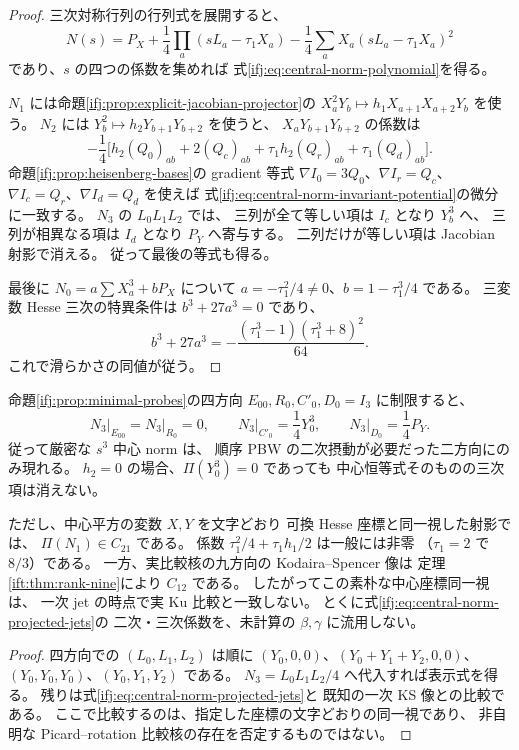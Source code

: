 \begin{proof}
三次対称行列の行列式を展開すると、
\[
 N(s)=P_X+\frac14\prod_a(sL_a-\tau_1X_a)
                  -\frac14\sum_aX_a(sL_a-\tau_1X_a)^2
\]
であり、$s$ の四つの係数を集めれば
式\eqref{ifj:eq:central-norm-polynomial}を得る。

$N_1$ には命題\ref{ifj:prop:explicit-jacobian-projector}の
$X_a^2Y_b\mapsto h_1X_{a+1}X_{a+2}Y_b$ を使う。
$N_2$ には
$Y_b^2\mapsto h_2Y_{b+1}Y_{b+2}$ を使うと、
$X_aY_{b+1}Y_{b+2}$ の係数は
\[
 -\frac14\bigl[
 h_2(Q_0)_{ab}+2(Q_c)_{ab}
  +\tau_1h_2(Q_r)_{ab}+\tau_1(Q_d)_{ab}\bigr].
\]
命題\ref{ifj:prop:heisenberg-bases}の gradient 等式
$\nabla I_0=3Q_0$、$\nabla I_r=Q_c$、
$\nabla I_c=Q_r$、$\nabla I_d=Q_d$ を使えば
式\eqref{ifj:eq:central-norm-invariant-potential}の微分に一致する。
$N_3$ の $L_0L_1L_2$ では、
三列が全て等しい項は $I_c$ となり $Y_b^3$ へ、
三列が相異なる項は $I_d$ となり $P_Y$ へ寄与する。
二列だけが等しい項は Jacobian 射影で消える。
従って最後の等式も得る。

最後に $N_0=a\sum X_a^3+bP_X$ について
$a=-\tau_1^2/4\ne0$、$b=1-\tau_1^3/4$ である。
三変数 Hesse 三次の特異条件は $b^3+27a^3=0$ であり、
\[
 b^3+27a^3
  =-\frac{(\tau_1^3-1)(\tau_1^3+8)^2}{64}.
\]
これで滑らかさの同値が従う。
\end{proof}

\begin{corollary}
\label{ifj:cor:central-norm-probes}
命題\ref{ifj:prop:minimal-probes}の四方向
$E_{00},R_0,C'_0,D_0=I_3$ に制限すると、
\[
 \left.N_3\right|_{E_{00}}
   =\left.N_3\right|_{R_0}=0,\qquad
 \left.N_3\right|_{C'_0}=\frac14Y_0^3,\qquad
 \left.N_3\right|_{D_0}=\frac14P_Y.
\]
従って厳密な $s^3$ 中心 norm は、
順序 PBW の二次摂動が必要だった二方向にのみ現れる。
$h_2=0$ の場合、$\Pi(Y_0^3)=0$ であっても
中心恒等式そのものの三次項は消えない。

ただし、中心平方の変数 $X,Y$ を文字どおり
可換 Hesse 座標と同一視した射影では、
$\Pi(N_1)\in C_{21}$ である。
係数 $\tau_1^2/4+\tau_1h_1/2$ は一般には非零
（$\tau_1=2$ で $8/3$）である。
一方、実比較核の九方向の Kodaira--Spencer 像は
定理\ref{ift:thm:rank-nine}により $C_{12}$ である。
したがってこの素朴な中心座標同一視は、
一次 jet の時点で実 Ku 比較と一致しない。
とくに式\eqref{ifj:eq:central-norm-projected-jets}の
二次・三次係数を、未計算の $\beta,\gamma$ に流用しない。
\end{corollary}

\begin{proof}
四方向での $(L_0,L_1,L_2)$ は順に
$(Y_0,0,0)$、$(Y_0+Y_1+Y_2,0,0)$、
$(Y_0,Y_0,Y_0)$、$(Y_0,Y_1,Y_2)$ である。
$N_3=L_0L_1L_2/4$ へ代入すれば表示式を得る。
残りは式\eqref{ifj:eq:central-norm-projected-jets}と
既知の一次 KS 像との比較である。
ここで比較するのは、指定した座標の文字どおりの同一視であり、
非自明な Picard--rotation 比較核の存在を否定するものではない。
\end{proof}

